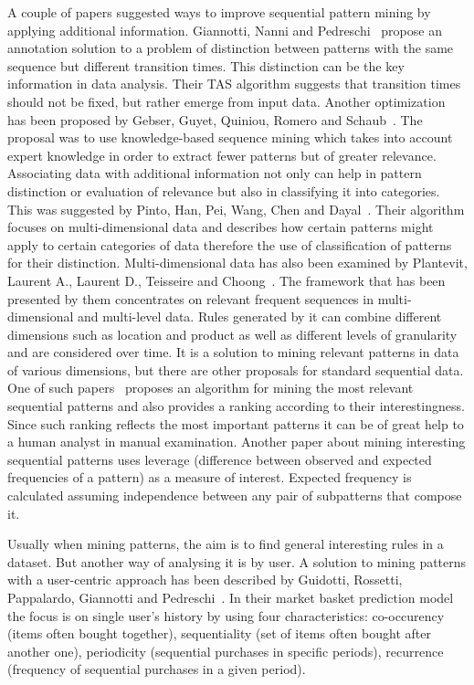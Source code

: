 \documentclass[runningheads,a4paper]{llncs}
\begin{document}
A couple of papers suggested ways to improve sequential pattern mining by applying additional information.
Giannotti, Nanni and Pedreschi~\cite{Giannotti:2006} propose an annotation solution to a problem of distinction between patterns with the same sequence but different transition times.
This distinction can be the key information in data analysis.
Their TAS algorithm suggests that transition times should not be fixed, but rather emerge from input data.
Another optimization has been proposed by Gebser, Guyet, Quiniou, Romero and Schaub~\cite{Gebser:2016}.
The proposal was to use knowledge-based sequence mining which takes into account expert knowledge in order to extract fewer patterns but of greater relevance.
Associating data with additional information not only can help in pattern distinction or evaluation of relevance but also in classifying it into categories.
This was suggested by Pinto, Han, Pei, Wang, Chen and Dayal~\cite{Pinto:2001}.
Their algorithm focuses on multi-dimensional data and describes how certain patterns might apply to certain categories of data therefore the use of classification of patterns for their distinction.
Multi-dimensional data has also been examined by Plantevit, Laurent A., Laurent D., Teisseire and Choong~\cite{Plantevit:2010}.
The framework that has been presented by them concentrates on relevant frequent sequences in multi-dimensional and multi-level data.
Rules generated by it can combine different dimensions such as location and product as well as different levels of granularity and are considered over time.
It is a solution to mining relevant patterns in data of various dimensions, but there are other proposals for standard sequential data.
One of such papers~\cite{Fowkes:2016} proposes an algorithm for mining the most relevant sequential patterns and also provides a ranking according to their interestingness.
Since such ranking reflects the most important patterns it can be of great help to a human analyst in manual examination.
Another paper\cite{Li:2015} about mining interesting sequential patterns uses leverage (difference between observed and expected frequencies of a pattern) as a measure of interest.
Expected frequency is calculated assuming independence between any pair of subpatterns that compose it.

Usually when mining patterns, the aim is to find general interesting rules in a dataset.
But another way of analysing it is by user.
A solution to mining patterns with a user-centric approach has been described by Guidotti, Rossetti, Pappalardo, Giannotti and Pedreschi~\cite{Guidotti:2017}.
In their market basket prediction model the focus is on single user’s history by using four characteristics: co-occurency (items often bought together), sequentiality (set of items often bought after another one), periodicity (sequential purchases in specific periods), recurrence (frequency of sequential purchases in a given period).
\end{document}
